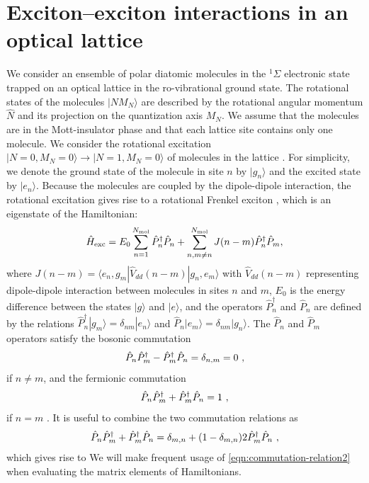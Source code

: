 \section{Exciton--exciton interactions in an optical lattice}
We consider an ensemble of polar diatomic molecules in the $^1\Sigma$ electronic state trapped on an optical lattice 
in the ro-vibrational ground state. The rotational states of the molecules $|NM_N\rangle$ are described by the
 rotational angular momentum $\hat{N}$ and its projection on the quantization axis $M_{N}$. We assume that the
 molecules are in the Mott-insulator phase \cite{umol, umol2, umol3} and that each lattice site contains only one
 molecule.  We consider the rotational excitation $|N=0, M_N = 0 \rangle \rightarrow |N = 1, M_N = 0 \rangle$ of
 molecules in the lattice \cite{note}. For simplicity, we denote the ground state of the molecule in site $n$ by 
$|g_{n}\rangle$ and the excited state by $|e_{n}\rangle$.  Because the molecules are coupled by the dipole-dipole
 interaction, the rotational excitation gives rise to a rotational Frenkel exciton \cite{felipe}, which is an eigenstate of
 the Hamiltonian: 
\begin{equation}
\hat{H}_{\rm exc} = E_0 \sum\limits_{n=1}^{N_{\rm mol}} \hat{P}_n^\dag
\hat{P}_n +  \sum\limits_{n,m \neq n}^{N_{\rm mol}}
J(n-m)\hat{P}_n^\dag \hat{P}_m,
\label{exciton}
\end{equation}
where $J(n-m) = \langle e_{n} , g_{m} | \hat{V}_{dd}(n-m) | g_{n}, e_{m} \rangle$ with $\hat{V}_{dd}(n-m)$ representing
 dipole-dipole interaction between molecules in sites $n$ and $m$, $E_0$ is the energy difference between the states
 $|g\rangle$ and $|e\rangle$, and the operators $\hat{P}_n^\dag$ and $\hat{P}_n$ are defined by the relations 
$\hat{P}_n^\dag | g_{m} \rangle = \delta_{nm} | e_{n}
\rangle$ and $\hat{P}_n | e_{m} \rangle = \delta_{nm} | g_{n} \rangle$.
The $\hat{P}_n$ and $\hat{P}_m$ operators satisfy the bosonic commutation
\begin{equation}
\hat{P}_{n}\hat{P}^{\dagger}_{m} - \hat{P}^{\dagger}_{m}\hat{P}_{n} = \delta_{n,m} = 0 \  ,
\end{equation}
 if $n \neq m$, and the fermionic commutation
\begin{equation}
\hat{P}_{n}\hat{P}^{\dagger}_{m} + \hat{P}^{\dagger}_{m}\hat{P}_{n} = 1 \  ,
\end{equation}
 if $n = m$ \cite{agranovich}. It is useful to combine the two commutation relations as 
\begin{equation}
\p{n}\pd{m} + \pd{m}\p{n} = \delta_{m,n} + (1-\delta_{m,n})2\pd{m}\p{n} \ ,  \label{eqn:commutation-relation}
\end{equation}
which gives rise to 
We will make frequent usage of \autoref{eqn:commutation-relation2} when evaluating the matrix elements of Hamiltonians. 


